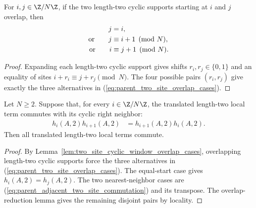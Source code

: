\begin{lemma}
    \label{lem:two_site_cyclic_window_overlap_cases}
    \leanok
    For $i,j\in\Z/N\Z$, if the two length-two cyclic supports starting at $i$
    and $j$ overlap, then
    \begin{align}
        j                 & =i,
        \notag                                 \\
        \text{or}\qquad j & \equiv i+1\pmod N,
        \notag                                 \\
        \text{or}\qquad i & \equiv j+1\pmod N.
        \label{eq:parent_two_site_overlap_cases}
    \end{align}
\end{lemma}

\begin{proof}
    \leanok
    Expanding each length-two cyclic support gives shifts
    $r_i,r_j\in\{0,1\}$ and an equality of sites
    $i+r_i\equiv j+r_j\pmod N$. The four possible pairs $(r_i,r_j)$ give
    exactly the three alternatives in
    (\ref{eq:parent_two_site_overlap_cases}).
\end{proof}

\begin{lemma}
    \label{lem:nncph_from_adjacent_two_site_commutation}
    \leanok
    Let $N\ge2$. Suppose that, for every $i\in\Z/N\Z$, the translated
    length-two local term commutes with its cyclic right neighbor:
    \begin{align}
        h_i(A,2)h_{i+1}(A,2)
         & =
        h_{i+1}(A,2)h_i(A,2).
        \label{eq:parent_adjacent_two_site_commutation}
    \end{align}
    Then all translated length-two local terms commute.
\end{lemma}

\begin{proof}
    \leanok
    By Lemma~\ref{lem:two_site_cyclic_window_overlap_cases}, overlapping
    length-two cyclic supports force the three alternatives in
    (\ref{eq:parent_two_site_overlap_cases}). The equal-start case gives
    $h_i(A,2)=h_j(A,2)$. The two nearest-neighbor cases are
    (\ref{eq:parent_adjacent_two_site_commutation}) and its transpose. The
    overlap-reduction lemma gives the remaining disjoint pairs by locality.
\end{proof}

